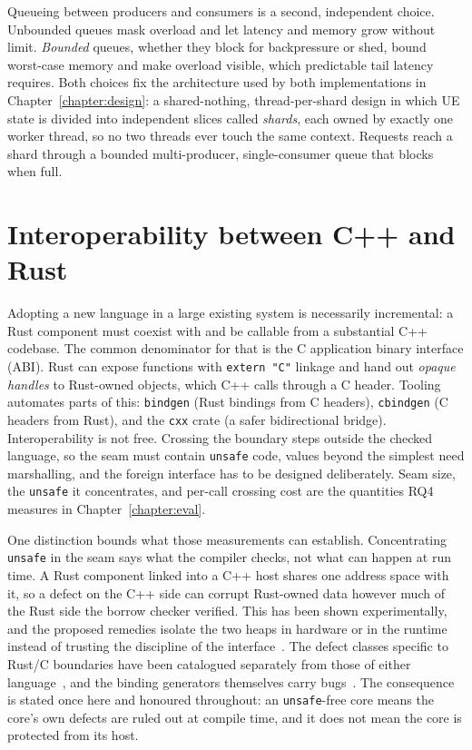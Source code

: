 \documentclass[english,twoside,openright,a4paper,censored,csm,software-track-2020]{HYthesisML}
\begin{document}
Queueing between producers and consumers is a second, independent choice. Unbounded queues mask
overload and let latency and memory grow without limit. \emph{Bounded} queues, whether they block
for backpressure or shed, bound worst-case memory and make overload visible, which predictable
tail latency requires. Both choices fix the architecture used by both implementations in
Chapter~\ref{chapter:design}: a shared-nothing, thread-per-shard design in which UE state is
divided into independent slices
called \emph{shards}, each owned by exactly one worker thread, so no two threads ever touch the
same context. Requests reach a shard through a bounded multi-producer, single-consumer queue that
blocks when full.

\section{Interoperability between C++ and Rust}\label{sec:interop}
Adopting a new language in a large existing system is necessarily incremental: a Rust component
must coexist with and be callable from a substantial C++ codebase. The common denominator for
that is the C application binary interface (ABI). Rust can expose functions with
\texttt{extern "C"} linkage and hand out \emph{opaque handles} to Rust-owned objects, which C++
calls through a C header. Tooling automates parts of this: \texttt{bindgen} (Rust bindings from
C headers), \texttt{cbindgen} (C headers from Rust), and the \texttt{cxx} crate (a safer
bidirectional bridge). Interoperability is not free. Crossing the boundary steps outside the
checked language, so the seam must contain \texttt{unsafe} code, values beyond the simplest need
marshalling, and the foreign interface has to be designed deliberately. Seam size, the
\texttt{unsafe} it concentrates, and per-call crossing cost are the quantities RQ4 measures in
Chapter~\ref{chapter:eval}.

One distinction bounds what those measurements can establish. Concentrating \texttt{unsafe} in
the seam says what the compiler checks, not what can happen at run time. A Rust component linked
into a C++ host shares one address space with it, so a defect on the C++ side can corrupt
Rust-owned data however much of the Rust side the borrow checker verified. This has been shown
experimentally, and the proposed remedies isolate the two heaps in hardware or in the runtime
instead of trusting the discipline of the
interface~\cite{rivera2021galeed,kirth2022pkrusafe}. The defect classes specific to Rust/C
boundaries have been catalogued separately from those of either
language~\cite{li2022crosslang}, and the binding generators themselves carry
bugs~\cite{cai2026interop}. The consequence is stated once here and honoured throughout: an
\texttt{unsafe}-free core means the core's own defects are ruled out at compile time, and it
does not mean the core is protected from its host.
\end{document}
